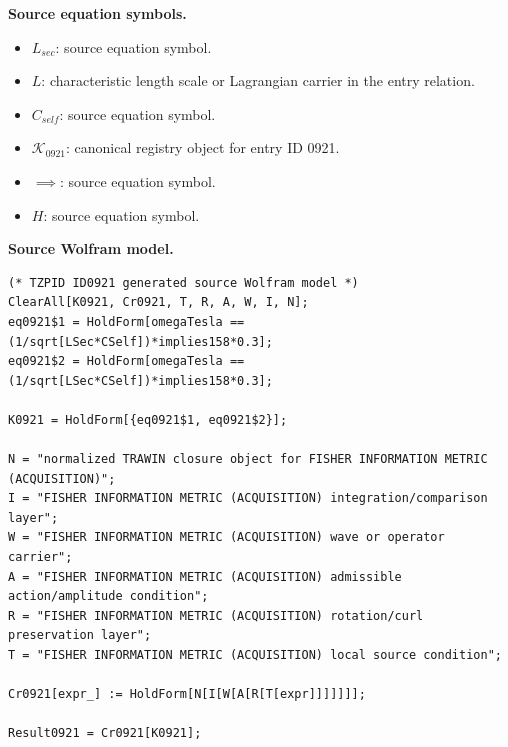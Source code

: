 \begin{minipage}[t]{0.49\linewidth}
\begingroup
\small
\raggedright
\textbf{Source equation symbols.}\par
\begin{itemize}[leftmargin=1.35em,itemsep=1pt,topsep=1pt,parsep=0pt]
    \item $L_{sec}$: source equation symbol.
    \item $L$: characteristic length scale or Lagrangian carrier in the entry relation.
    \item $C_{self}$: source equation symbol.
    \item $\mathcal{K}_{0921}$: canonical registry object for entry ID 0921.
    \item $\implies$: source equation symbol.
    \item $H$: source equation symbol.
\end{itemize}
\endgroup
\end{minipage}\hfill
\begin{minipage}[t]{0.47\linewidth}
\begingroup
\scriptsize
\raggedright
\textbf{Source Wolfram model.}\par
\begin{Verbatim}[fontsize=\tiny,breaklines=true,breakanywhere=true]
(* TZPID ID0921 generated source Wolfram model *)
ClearAll[K0921, Cr0921, T, R, A, W, I, N];
eq0921$1 = HoldForm[omegaTesla == (1/sqrt[LSec*CSelf])*implies158*0.3];
eq0921$2 = HoldForm[omegaTesla == (1/sqrt[LSec*CSelf])*implies158*0.3];

K0921 = HoldForm[{eq0921$1, eq0921$2}];

N = "normalized TRAWIN closure object for FISHER INFORMATION METRIC (ACQUISITION)";
I = "FISHER INFORMATION METRIC (ACQUISITION) integration/comparison layer";
W = "FISHER INFORMATION METRIC (ACQUISITION) wave or operator carrier";
A = "FISHER INFORMATION METRIC (ACQUISITION) admissible action/amplitude condition";
R = "FISHER INFORMATION METRIC (ACQUISITION) rotation/curl preservation layer";
T = "FISHER INFORMATION METRIC (ACQUISITION) local source condition";

Cr0921[expr_] := HoldForm[N[I[W[A[R[T[expr]]]]]]];

Result0921 = Cr0921[K0921];
\end{Verbatim}
\endgroup
\end{minipage}

